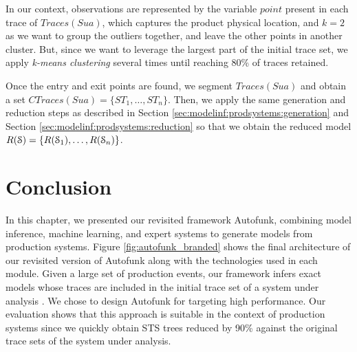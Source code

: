 In our context, observations are represented by the variable
$point$ present in each trace of $Traces({Sua})$, which captures
the product physical location, and $k=2$ as we want to group the
outliers together, and leave the other points in another cluster.
But, since we want to leverage the largest part of the initial
trace set, we apply \textit{k-means clustering} several times
until reaching 80\% of traces retained.

Once the entry and exit points are found, we segment
$Traces({Sua})$ and obtain a set $CTraces({Sua})=\{ST_1, \dots,
ST_n\}$. Then, we apply the same generation and reduction steps
as described in Section \ref{sec:modelinf:prodsystems:generation}
and Section \ref{sec:modelinf:prodsystems:reduction} so that we
obtain the reduced model $R(\EuScript{S}) =
\{R(\EuScript{S}_1),\dots,R(\EuScript{S}_n)\}$.


\section{Conclusion}
\label{sec:modelinf:prodsystems:conclusion}

In this chapter, we presented our revisited framework Autofunk,
combining model inference, machine learning, and expert systems
to generate models from production systems. Figure
\ref{fig:autofunk_branded} shows the final architecture of our
revisited version of Autofunk along with the technologies used in
each module. Given a large set of production events, our
framework infers exact models whose traces are included in the
initial trace set of a system under analysis \cite{petrenko06}.
We chose to design Autofunk for targeting high performance. Our
evaluation shows that this approach is suitable in the context of
production systems since we quickly obtain STS trees reduced by
90\% against the original trace sets of the system under
analysis.

